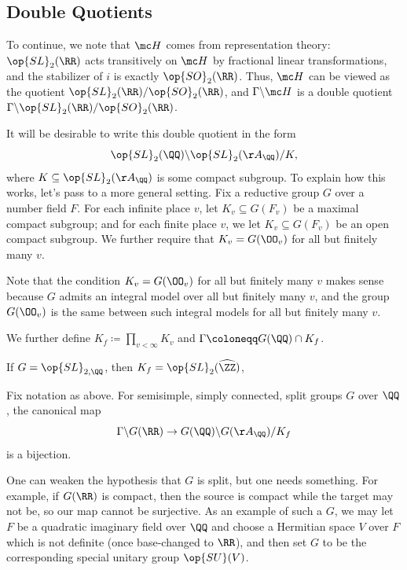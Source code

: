 \documentclass[../notes.tex]{subfiles}
\begin{document}
\subsection{Double Quotients}
To continue, we note that $\mc H$ comes from representation theory: $\op{SL}_2(\RR)$ acts transitively on $\mc H$ by fractional linear transformations, and the stabilizer of $i$ is exactly $\op{SO}_2(\RR)$. Thus, $\mc H$ can be viewed as the quotient $\op{SL}_2(\RR)/\op{SO}_2(\RR)$, and $\Gamma\backslash\mc H$ is a double quotient $\Gamma\backslash\op{SL}_2(\RR)/\op{SO}_2(\RR)$.

It will be desirable to write this double quotient in the form
\[\op{SL}_2(\QQ)\backslash\op{SL}_2(\AA_\QQ)/K,\]
where $K\subseteq\op{SL}_2(\AA_\QQ)$ is some compact subgroup. To explain how this works, let's pass to a more general setting. Fix a reductive group $G$ over a number field $F$. For each infinite place $v$, let $K_v\subseteq G(F_v)$ be a maximal compact subgroup; and for each finite place $v$, we let $K_v\subseteq G(F_v)$ be an open compact subgroup. We further require that $K_v=G(\OO_v)$ for all but finitely many $v$.
\begin{remark}
	Note that the condition $K_v=G(\OO_v)$ for all but finitely many $v$ makes sense because $G$ admits an integral model over all but finitely many $v$, and the group $G(\OO_v)$ is the same between such integral models for all but finitely many $v$.
\end{remark}
We further define $K_f\coloneqq\prod_{v<\infty}K_v$ and $\Gamma\coloneqq G(\QQ)\cap K_f$.
\begin{example}
	If $G=\op{SL}_{2,\QQ}$, then $K_f=\op{SL}_2(\widehat{\ZZ})$, 
\end{example}
\begin{theorem} \label{thm:get-strong-approx}
	Fix notation as above. For semisimple, simply connected, split groups $G$ over $\QQ$, the canonical map
	\[\Gamma\backslash G(\RR)\to G(\QQ)\backslash G(\AA_\QQ)/K_f\]
	is a bijection.
\end{theorem}
\begin{remark}
	One can weaken the hypothesis that $G$ is split, but one needs something. For example, if $G(\RR)$ is compact, then the source is compact while the target may not be, so our map cannot be surjective. As an example of such a $G$, we may let $F$ be a quadratic imaginary field over $\QQ$ and choose a Hermitian space $V$ over $F$ which is not definite (once base-changed to $\RR$), and then set $G$ to be the corresponding special unitary group $\op{SU}(V)$.
\end{remark}
\end{document}
